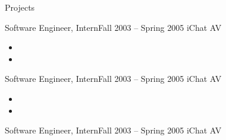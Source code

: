 \documentclass[]{Sohaib-Mohamed}
\begin{document}
\begin{cvsection}{Projects}
   \begin{cvsubsection}{Software Engineer, Intern}{}{Fall 2003 -- Spring 2005}
      iChat AV
      \begin{itemize}
         \item
         \item
      \end{itemize}
   \end{cvsubsection}
   \begin{cvsubsection}{Software Engineer, Intern}{}{Fall 2003 -- Spring 2005}
      iChat AV
      \begin{itemize}
         \item
         \item
      \end{itemize}
   \end{cvsubsection}
   \begin{cvsubsection}{Software Engineer, Intern}{}{Fall 2003 -- Spring 2005}
      iChat AV
      \begin{itemize}

\end{itemize}
\end{cvsubsection}
\end{cvsection}
\end{document}
